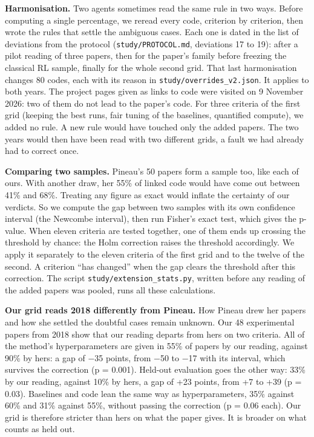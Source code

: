 \documentclass[11pt,a4paper]{article}
\begin{document}
\textbf{Harmonisation.} Two agents sometimes read the same rule in two
ways. Before computing a single percentage, we reread every code,
criterion by criterion, then wrote the rules that settle the ambiguous
cases. Each one is dated in the list of deviations from the protocol
(\texttt{study/PROTOCOL.md}, deviations 17 to 19): after a pilot reading
of three papers, then for the paper's family before freezing the
classical RL sample, finally for the whole second grid. That last
harmonisation changes 80 codes, each with its reason in
\texttt{study/overrides\_v2.json}. It applies to both years. The project
pages given as links to code were visited on 9 November 2026: two of
them do not lead to the paper's code. For three criteria of the first
grid (keeping the best runs, fair tuning of the baselines, quantified
compute), we added no rule. A new rule would have touched only the added
papers. The two years would then have been read with two different
grids, a fault we had already had to correct once.

\textbf{Comparing two samples.} Pineau's 50 papers form a sample too,
like each of ours. With another draw, her 55\% of linked code would have
come out between 41\% and 68\%. Treating any figure as exact would
inflate the certainty of our verdicts. So we compute the gap between two
samples with its own confidence interval (the Newcombe interval), then
run Fisher's exact test, which gives the p-value. When eleven criteria
are tested together, one of them ends up crossing the threshold by
chance: the Holm correction raises the threshold accordingly. We apply
it separately to the eleven criteria of the first grid and to the twelve
of the second. A criterion ``has changed'' when the gap clears the
threshold after this correction. The script
\texttt{study/extension\_stats.py}, written before any reading of the
added papers was pooled, runs all these calculations.

\textbf{Our grid reads 2018 differently from Pineau.} How Pineau drew
her papers and how she settled the doubtful cases remain unknown. Our 48
experimental papers from 2018 show that our reading departs from hers on
two criteria. All of the method's hyperparameters are given in 55\% of
papers by our reading, against 90\% by hers: a gap of −35 points, from
−50 to −17 with its interval, which survives the correction (p = 0.001).
Held-out evaluation goes the other way: 33\% by our reading, against
10\% by hers, a gap of +23 points, from +7 to +39 (p = 0.03). Baselines
and code lean the same way as hyperparameters, 35\% against 60\% and
31\% against 55\%, without passing the correction (p = 0.06 each). Our
grid is therefore stricter than hers on what the paper gives. It is
broader on what counts as held out.
\end{document}

